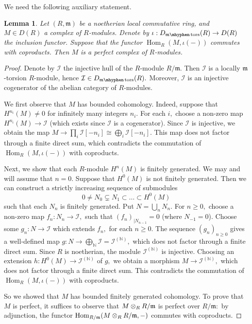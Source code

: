 \documentclass[11pt,leqno]{amsart}
\newtheorem{lemma}[theo]{Lemma}
\numberwithin{equation}{section}
\def\N{\mathbb{N}}
\def\Hom{\operatorname{Hom}}
\newcommand{\tens}[1]{%
  \mathbin{\mathop{\otimes}\displaylimits_{#1}}%
}
\newcommand{\hy}{\mhyphen}
\newcommand{\prodd}[1][]{\mathop{\prod}\limits_{#1}}
\newcommand{\cI}{{\mathcal I}}
\newcommand{\tors}{\operatorname{tors}}
\newcommand{\m}{\mathfrak{m}}
\begin{document}
We need the following auxiliary statement.

\begin{lemma}\label{lem:perfectnessOver_local_rings} Let $(R,\m)$ be a noetherian local commutative ring, and $M\in D(R)$ a complex of $R$-modules. Denote by $\iota:D_{\m\hy\tors}(R)\to D(R)$ the inclusion functor. Suppose that the functor $\Hom_R(M,\iota(-))$ commutes with coproducts. Then $M$ is a perfect complex of $R$-modules.\end{lemma}

\begin{proof}Denote by $\cI$ the injective hull of the $R$-module $R/\m.$ Then $\cI$ is a locally $\m$-torsion $R$-module, hence $\cI\in D_{\m\hy\tors}(R).$ Moreover, $\cI$ is an injective cogenerator of the abelian category of $R$-modules.

We first observe that $M$ has bounded cohomology. Indeed, suppose that $H^{n_i}(M)\ne 0$ for infinitely many integers $n_i.$ For each $i,$ choose a non-zero map $H^{n_i}(M)\to\cI$ (which exists since $\cI$ is a cogenerator). Since $\cI$ is injective, we obtain the map $M\to\prodd[i]\cI[-n_i]\cong \bigoplus\limits_i\cI[-n_i].$ This map does not factor through a finite direct sum, which contradicts the commutation of $\Hom_R(M,\iota(-))$ with coproducts.

Next, we show that each $R$-module $H^n(M)$ is finitely generated. We may and will assume that $n=0.$ Suppose that $H^0(M)$ is not finitely generated. Then we can construct a strictly increasing sequence of submodules $$0\ne N_0\subsetneq N_1\subset\dots\subset H^0(M)$$ such that each $N_n$ is finitely generated. Put $N=\bigcup_{n} N_n.$ For $n\geq 0,$ choose a non-zero map $f_n:N_n\to \cI,$ such that $(f_n)_{\mid N_{n-1}}=0$ (where $N_{-1}=0$). Choose some $g_n:N\to \cI$ which extends $f_n,$ for each $n\geq 0.$ The sequence $(g_n)_{n\geq 0}$ gives a well-defined map $g:N\to\bigoplus\limits_{\N}\cI=\cI^{(\N)},$ which does not factor through a finite direct sum. Since $R$ is noetherian, the module $\cI^{(\N)}$ is injective. Choosing an extension $h:H^0(M)\to\cI^{(\N)}$ of $g,$ we obtain a morphism $M\to\cI^{(\N)},$ which does not factor through a finite direct sum. This contradicts the commutation of $\Hom_R(M,\iota(-))$ with coproducts.

So we showed that $M$ has bounded finitely generated cohomology. To prove that $M$ is perfect, it suffices to observe that $M\tens{R}R/\m$ is perfect over $R/\m:$ by adjunction, the functor $\Hom_{R/\m}(M\tens{R}R/\m,-)$ commutes with coproducts.
\end{proof}
\end{document}
